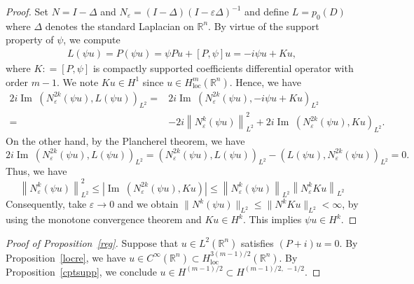\documentclass[AHL,Unicode,longabstracts,published]{cedram}
\newcommand*\e{\varepsilon}
\newcommand*\g{\psi}
\newcommand*\re{\mathbb{R}}
\newcommand*\coloneqq{\mathrel{\mathop:}=}
\DeclareMathOperator{\Iml}{Im\;}
\DeclareMathOperator{\loc}{loc}
\begin{document}
\begin{proof}
Set $N = I - \Delta$ and $N_{\e} = (I - \Delta)(I - \e \Delta)^{-1}$ and define $L =p_0(D)$ where $\Delta$ denotes the standard Laplacian on $\re^n$. By virtue of the support property of $\g$, we compute
\begin{align*}
L(\g u) = P(\g u) = \g Pu + [P, \g]u =- i\g u + Ku,
\end{align*}
where $K\coloneqq [P, \g]$ is compactly supported coefficients differential operator with order $m-1$. We note $Ku \in H^1$ since $u\in H^m_{\loc}(\re^n)$. Hence, we have
\begin{align*}
2i\Iml\left(N_\e^{2k}(\g u), L(\g u)\right)_{L^2} = & 2i\Iml\left(N_\e^{2k}(\g u), -i\g u + Ku\right)_{L^2}\\
= & -2i\left\| N_\e^{k} (\g u)\right\|_{L^2}^2 + 2i\Iml\left(N_\e^{2k} (\g u), Ku\right)_{L^2}.
\end{align*}
On the other hand, by the Plancherel theorem, we have
\[
2i\Iml \left(N_\e^{2k} (\g u), L(\g u)\right)_{L^2} = \left(N_\e^{2k} (\g u), L(\g u)\right)_{L^2} - \left(L(\g u), N_\e^{2k} (\g u)\right)_{L^2}=0.
\]
Thus, we have
\[
\left\| N_\e^{k} (\g u) \right\|_{L^2}^2
\leq \left| \Iml \left(N_{\e}^{2k} (\g u), Ku\right) \right| \leq \left\| N_\e^{k} (\g u)\right\|_{L^2} \left\| N_\e^{k} Ku\right\|_{L^2}
\]
Consequently, take $\e \to 0$ and we obtain $\| N^{k} (\g u)\|_{L^2}\leq \| N^{k} Ku \|_{L^2}< \infty$, by using the monotone convergence theorem and $Ku \in H^k$. This implies $\g u \in H^k$.
\end{proof}

\begin{proof}[Proof of Proposition~\ref{reg}]
Suppose that $u\in L^2(\re^n)$ satisfies $(P+i)u=0$. By Proposition~\ref{locre}, we have $u\in C^{\infty}(\re^n)\subset H^{3(m-1)/2}_{\loc}(\re^n)$. By Proposition~\ref{cptsupp}, we conclude $u\in H^{(m-1)/2}\subset H^{(m-1)/2,\,-1/2}$.
\end{proof}




\end{document}
